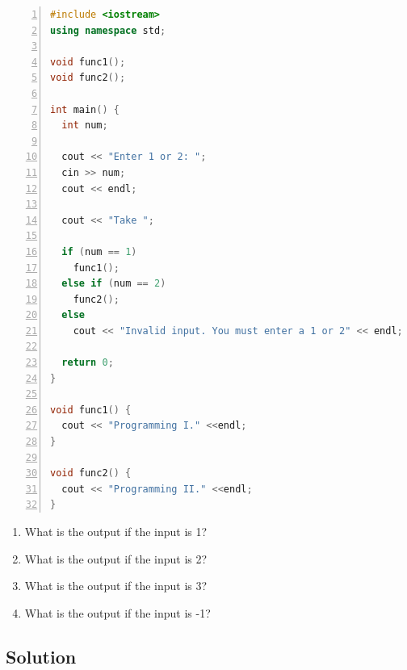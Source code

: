 \documentclass[a4paper, 10pt]{article}
\begin{document}
    \begin{lstlisting}[language=c++,numbers=left]
#include <iostream>
using namespace std; 

void func1(); 
void func2(); 

int main() { 
  int num;

  cout << "Enter 1 or 2: "; 
  cin >> num; 
  cout << endl;

  cout << "Take ";

  if (num == 1) 
    func1(); 
  else if (num == 2) 
    func2(); 
  else 
    cout << "Invalid input. You must enter a 1 or 2" << endl; 

  return 0; 
}

void func1() { 
  cout << "Programming I." <<endl;
}

void func2() { 
  cout << "Programming II." <<endl;
}
    \end{lstlisting}

    \begin{enumerate}[label=\Alph*.]
      \item What is the output if the input is 1?
      \item What is the output if the input is 2?
      \item What is the output if the input is 3?
      \item What is the output if the input is -1?
    \end{enumerate}
    \subsection{Solution}
      \begin{table}[H]
      \end{table}


  \newpage
\end{document}
